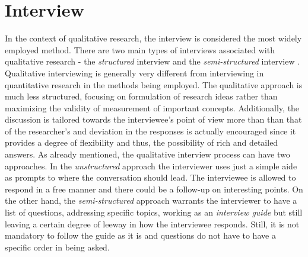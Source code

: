 \section{Interview}

In the context of qualitative research, the interview is considered the most widely employed method. There are two main types of interviews associated with qualitative research - the \textit{structured} interview and the \textit{semi-structured} interview \cite{Bryman}. Qualitative interviewing is generally very different from  interviewing in quantitative research in the methods being employed. The qualitative approach is much less structured, focusing on formulation of research ideas rather than maximizing the validity of measurement of important concepts. Additionally, the discussion is tailored towards the interviewee's point of view more than than that of the researcher's and deviation in the responses is actually encouraged since it provides a degree of flexibility and thus, the possibility of rich and detailed answers. As already mentioned, the qualitative interview process can have two approaches. In the \textit{unstructured} approach the interviewer uses just a simple aide as prompts to where the conversation should lead. The interviewee is allowed to respond in a free manner and there could be a follow-up on interesting points. On the other hand, the \textit{semi-structured} approach warrants the interviewer to have a list of questions, addressing specific topics, working as an \textit{interview guide} but still leaving a certain degree of leeway in how the interviewee responds. Still, it is not mandatory to follow the guide as it is and questions do not have to have a specific order in being asked. 

